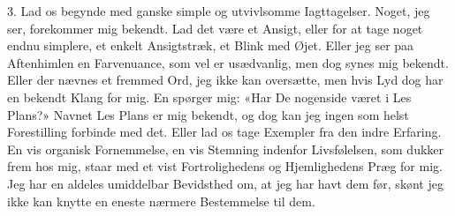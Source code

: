 \documentclass[12pt,a4paper,openany]{book}
\begin{document}
3. Lad os begynde med ganske simple og utvivlsomme Iagttagelser. Noget, jeg
ser, forekommer mig bekendt. Lad det være et Ansigt, eller for at tage noget
endnu simplere, et enkelt Ansigtstræk, et Blink med Øjet. Eller jeg ser paa
Aftenhimlen en Farvenuance, som vel er usædvanlig, men dog synes mig bekendt.
Eller der nævnes et fremmed Ord, jeg ikke kan oversætte, men hvis Lyd dog har
en bekendt Klang for mig. En spørger mig: «Har De nogenside %
været i Les Plans?» Navnet Les Plans er mig bekendt, og dog kan jeg ingen som
helst Forestilling forbinde med det. Eller lad os tage Exempler fra den indre
Erfaring. En vis organisk Fornemmelse, en vis Stemning indenfor Livsfølelsen,
som dukker frem hos mig, staar med et vist Fortrolighedens og Hjemlighedens
Præg for mig. Jeg har en aldeles umiddelbar Bevidsthed om, at jeg har havt dem
før, skønt jeg ikke kan knytte en eneste nærmere Bestemmelse til dem.
\end{document}
